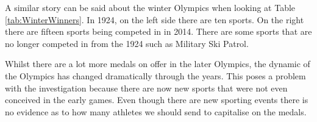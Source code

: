 \documentclass[
]{article}
\begin{document}
A similar story can be said about the winter Olympics when looking at Table \ref{tab:WinterWinners}. In 1924, on the left side there are ten sports. On the right there are fifteen sports being competed in in 2014. There are some sports that are no longer competed in from the 1924 such as Military Ski Patrol.

Whilst there are a lot more medals on offer in the later Olympics, the dynamic of the Olympics has changed dramatically through the years. This poses a problem with the investigation because there are now new sports that were not even conceived in the early games. Even though there are new sporting events there is no evidence as to how many athletes we should send to capitalise on the medals.

\begin{table}
\centering\caption{\label{tab:SummerWinners}Number of medal winners in 1896 versus 2016 Summer Olympic Games}


\end{table}
\end{document}
